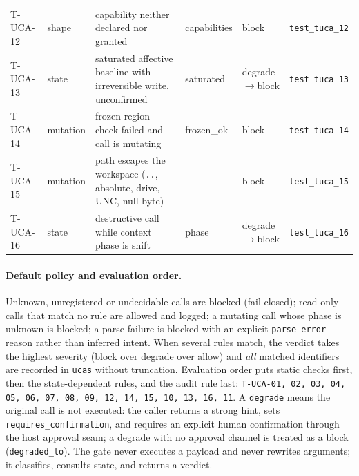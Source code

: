 \begin{table}[t]
\begin{tabular}{llp{3.6cm}lp{2.2cm}l}
T-UCA-12 & shape        & capability neither declared nor granted & capabilities & block & \texttt{test\_tuca\_12} \\
T-UCA-13 & state        & saturated affective baseline with irreversible write, unconfirmed & saturated & degrade$\rightarrow$block & \texttt{test\_tuca\_13} \\
T-UCA-14 & mutation     & frozen-region check failed and call is mutating & frozen\_ok & block & \texttt{test\_tuca\_14} \\
T-UCA-15 & mutation     & path escapes the workspace (\texttt{..}, absolute, drive, UNC, null byte) & --- & block & \texttt{test\_tuca\_15} \\
T-UCA-16 & state        & destructive call while context phase is shift & phase & degrade$\rightarrow$block & \texttt{test\_tuca\_16} \\
\bottomrule
\end{tabular}
\end{table}

\paragraph{Default policy and evaluation order.} Unknown, unregistered or
undecidable calls are blocked (\mbox{fail-closed}); read-only calls that match no rule
are allowed and logged; a mutating call whose phase is unknown is blocked; a
parse failure is blocked with an explicit \texttt{parse\_error} reason rather
than inferred intent. When several rules match, the verdict takes the highest
severity (block over degrade over allow) and \emph{all} matched identifiers are
recorded in \texttt{ucas} without truncation. Evaluation order puts static checks
first, then the state-dependent rules, and the audit rule last:
\texttt{T-\allowbreak{}UCA-\allowbreak{}01, 02, 03, 04, 05, 06, 07, 08, 09, 12, 14, 15, 10, 13, 16, 11}.
A \texttt{degrade} means the original call is not executed: the caller returns a
strong hint, sets \texttt{requires\_\allowbreak{}confirmation}, and requires an explicit human
confirmation through the host approval seam; a degrade with no approval channel
is treated as a block (\texttt{degraded\_to}). The gate never executes a payload
and never rewrites arguments; it classifies, consults state, and returns a
verdict.


